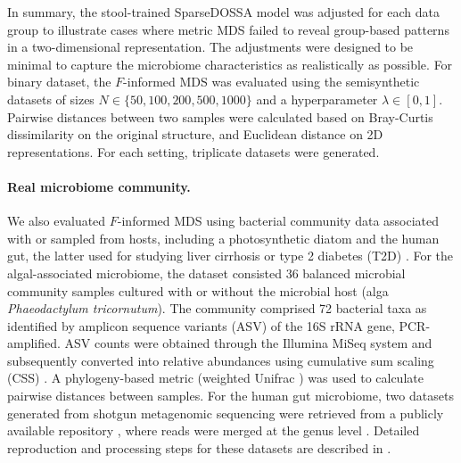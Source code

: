 \documentclass[10pt,letterpaper]{article}
\newcommand{\1}{{\rm 1}\kern-0.24em{\rm I}}
\begin{document}
In summary, the stool-trained SparseDOSSA model was adjusted for each data group to illustrate cases where metric MDS failed to reveal group-based patterns in a two-dimensional representation. The adjustments were designed to be minimal to capture the microbiome characteristics as realistically as possible. For binary dataset, the $F$-informed MDS was evaluated using the semisynthetic datasets of sizes $N\in\{50,100,200,500,1000\}$ and a hyperparameter $\lambda\in[0, 1]$. Pairwise distances between two samples were calculated based on Bray-Curtis dissimilarity on the original structure, and Euclidean distance on 2D representations. For each setting, triplicate datasets were generated.

\paragraph*{Real microbiome community.}
We also evaluated $F$-informed MDS using bacterial community data associated with or sampled from hosts, including a photosynthetic diatom \cite{kim22} and the human gut, the latter used for studying liver cirrhosis \cite{Qin14} or type 2 diabetes (T2D) \cite{Karlsson13, Qin12}. 
For the algal-associated microbiome, the dataset consisted 36 balanced microbial community samples cultured with or without the microbial host (alga \textit{Phaeodactylum tricornutum}). The community comprised 72 bacterial taxa as identified by amplicon sequence variants (ASV) of the 16S rRNA gene, PCR-amplified. ASV counts were obtained through the Illumina MiSeq system and subsequently converted into relative abundances using cumulative sum scaling (CSS) \cite{paulson13}. A phylogeny-based metric (weighted Unifrac \cite{lozupone07}) was used to calculate pairwise distances between samples.
For the human gut microbiome, two datasets generated from shotgun metagenomic sequencing were retrieved from a publicly available repository \cite{Pasolli16}, where reads were merged at the genus level \cite{reiman20}. Detailed reproduction and processing steps for these datasets are described in .
\end{document}
